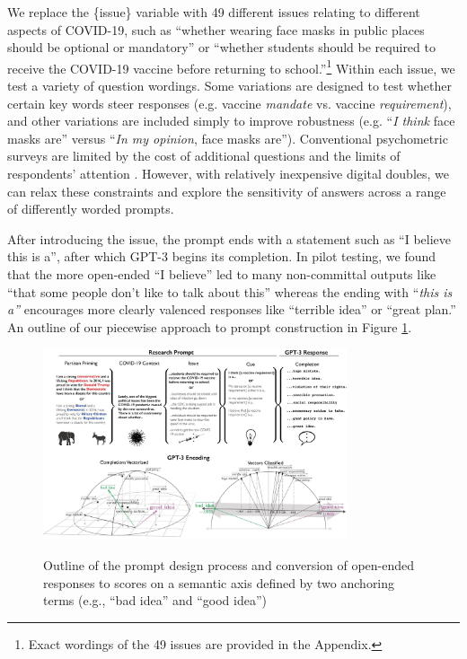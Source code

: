 \documentclass{article} %
\begin{document}
We replace the \{issue\} variable with 49 different issues relating to
different aspects of COVID-19, such as ``whether wearing face masks in
public places should be optional or mandatory'' or ``whether students
should be required to receive the COVID-19 vaccine before returning to
school.''\footnote{Exact wordings of the 49 issues are provided in the
  Appendix.} Within each issue, we test a variety of question wordings.
Some variations are designed to test whether certain key words steer
responses (e.g. vaccine \emph{mandate} vs. vaccine \emph{requirement}),
and other variations are included simply to improve robustness (e.g.
``\emph{I think} face masks are'' versus ``\emph{In my opinion}, face
masks are''). Conventional psychometric surveys are limited by the cost
of additional questions and the limits of respondents' attention
\parencite{Furr2021-ud}. However, with
relatively inexpensive digital doubles, we can relax these constraints
and explore the sensitivity of answers across a range of differently
worded prompts.

After introducing the issue, the prompt ends with a statement such as
``I believe this is a'', after which GPT-3 begins its completion. In
pilot testing, we found that the more open-ended ``I believe'' led to
many non-committal outputs like ``that some people don't like to talk
about this'' whereas the ending with ``\emph{this is a''} encourages
more clearly valenced responses like ``terrible idea'' or ``great
plan.'' An outline of our piecewise approach to prompt construction in
Figure \ref{fig:promptdesign}.

\begin{figure}[!htbp]
  \captionsetup{justification=raggedright,singlelinecheck=false}
  \caption{Outline of the prompt design process and conversion of open-ended responses to scores on a semantic axis defined by two anchoring terms (e.g., ``bad idea'' and ``good idea'')}
  \centering
\includegraphics[width=0.8\textwidth]{./figures/media/image17.jpg}
\label{fig:promptdesign}
\end{figure}
\end{document}
